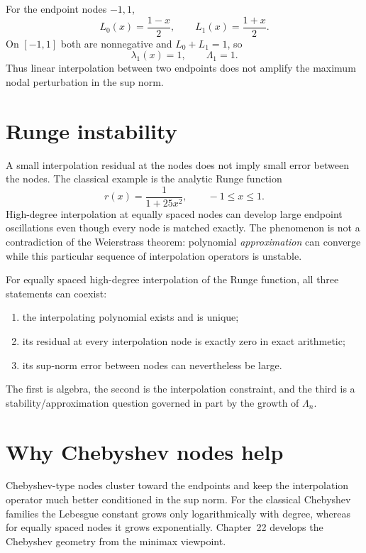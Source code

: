 \begin{example}\label{ex:ii20-lebesgue-01}
For the endpoint nodes $-1,1$,
\[
L_0(x)=\frac{1-x}{2},\qquad L_1(x)=\frac{1+x}{2}.
\]
On $[-1,1]$ both are nonnegative and $L_0+L_1=1$, so
\[
\lambda_1(x)=1,\qquad \Lambda_1=1.
\]
Thus linear interpolation between two endpoints does not amplify the maximum nodal perturbation in the sup norm.
\end{example}

\section{Runge instability}
A small interpolation residual at the nodes does not imply small error between the nodes. The classical example is the analytic Runge function
\[
r(x)=\frac{1}{1+25x^2},\qquad -1\le x\le1.
\]
High-degree interpolation at equally spaced nodes can develop large endpoint oscillations even though every node is matched exactly. The phenomenon is not a contradiction of the Weierstrass theorem: polynomial \emph{approximation} can converge while this particular sequence of interpolation operators is unstable.

\begin{example}\label{ex:ii20-runge-01}
For equally spaced high-degree interpolation of the Runge function, all three statements can coexist:
\begin{enumerate}
\item the interpolating polynomial exists and is unique;
\item its residual at every interpolation node is exactly zero in exact arithmetic;
\item its sup-norm error between nodes can nevertheless be large.
\end{enumerate}
The first is algebra, the second is the interpolation constraint, and the third is a stability/approximation question governed in part by the growth of $\Lambda_n$.
\end{example}

\section{Why Chebyshev nodes help}
Chebyshev-type nodes cluster toward the endpoints and keep the interpolation operator much better conditioned in the sup norm. For the classical Chebyshev families the Lebesgue constant grows only logarithmically with degree, whereas for equally spaced nodes it grows exponentially. Chapter~22 develops the Chebyshev geometry from the minimax viewpoint.

